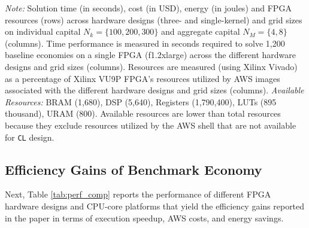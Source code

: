 \documentclass[12pt,american]{article}
\makeatletter
\newcommand{\awsinstfI}{f1.2xlarge\@\xspace}
\newcommand{\numbeconII}{1,200\@\xspace}
\newcommand{\CLdesignLUT}{895 thousand}
\newcommand{\CLdesignDSP}{5,640}
\newcommand{\CLdesignRegisters}{1,790,400}
\newcommand{\CLdesignBRAM}{1,680}
\newcommand{\CLdesignURAM}{800}
\makeatother
\begin{document}
\begin{table}[ht!]
\begin{center}
\end{center}
\label{tab:res}
\small \textit{Note:} Solution time (in seconds), cost (in USD), energy (in joules) and FPGA resources (rows) across hardware designs (three- and single-kernel) and grid sizes on individual capital $N_{k}=\{100,200,300\}$ and aggregate capital $N_{M}=\{4,8\}$ (columns). Time performance is measured in seconds required to solve \numbeconII baseline economies on a single FPGA (\awsinstfI) across the different hardware designs and grid sizes (columns). Resources are measured (using Xilinx Vivado) as a percentage of Xilinx VU9P FPGA's resources utilized by AWS images associated with the different hardware designs and grid sizes (columns). \textit{Available Resources:} BRAM (\CLdesignBRAM), DSP (\CLdesignDSP), Registers (\CLdesignRegisters), LUTs (\CLdesignLUT), URAM (\CLdesignURAM). Available resources are lower than total resources because they exclude resources utilized by the AWS shell that are not available for \texttt{CL} design.
\end{table}

\subsection{Efficiency Gains of Benchmark Economy}\label{app:effgai}

Next, Table \ref{tab:perf_comp} reports the performance of different FPGA hardware designs and CPU-core platforms that yield the efficiency gains reported in the paper in terms of execution speedup, AWS costs, and energy savings.
\end{document}
